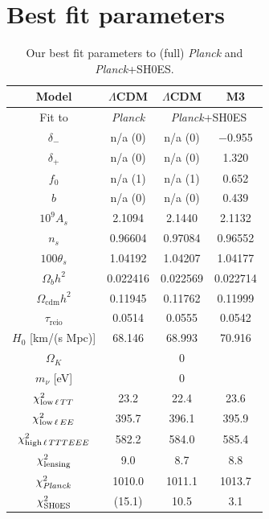 \section{Best fit parameters}
\label{sec:bestfits}

\begin{table}[ht!]
\centering
\begin{tabular}{|c|c|c|c|}
\hline
Model & $\Lambda$CDM & $\Lambda$CDM & M3 \\
\hline
Fit to & {\it Planck} & \multicolumn{2}{c|}{{\it Planck}+SH0ES} \\
\hline
$\delta_-$ & n/a (0) & n/a (0) & $-$0.955 \\
$\delta_+$ & n/a (0) & n/a (0) & 1.320 \\
$f_0$ & n/a (1) & n/a (1) & 0.652 \\
\hline
$b$ & n/a (0) & n/a (0) & 0.439 \\
\hline
$10^9 A_s$ & 2.1094 & 2.1440 & 2.1132 \\
$n_s$ & 0.96604 & 0.97084 & 0.96552 \\
$100\theta_s$ & 1.04192 & 1.04207 & 1.04177 \\
$\Omega_b h^2$ & 0.022416 & 0.022569 & 0.022714 \\
$\Omega_\mathrm{cdm} h^2$ & 0.11945 & 0.11762 & 0.11999 \\
$\tau_\mathrm{reio}$ & 0.0514 & 0.0555 & 0.0542 \\
\hline
$H_0$ [km/(s Mpc)] & 68.146 & 68.993 & 70.916 \\
\hline
$\Omega_K$ & \multicolumn{3}{c|}{0} \\
$m_\nu$ [eV] & \multicolumn{3}{c|}{0} \\
\hline
$\chi^2_{{\rm low}\,\ell\,TT}$ & 23.2 & 22.4 & 23.6 \\
$\chi^2_{{\rm low}\,\ell\,EE}$ & 395.7 & 396.1 & 395.9 \\
$\chi^2_{{\rm high}\,\ell\,TTTEEE}$ & 582.2 & 584.0 & 585.4 \\
$\chi^2_{\rm lensing}$ & 9.0 & 8.7 & 8.8 \\
\hline
$\chi^2_{\it Planck}$ & 1010.0 & 1011.1 & 1013.7 \\
\hline
$\chi^2_{\rm SH0ES}$ & (15.1) & 10.5 & 3.1 \\
\hline
\end{tabular}
\caption{Our best fit parameters to (full) {\it Planck} and {\it Planck}+SH0ES.}
\label{tab:bestfits-planck}
\end{table}

